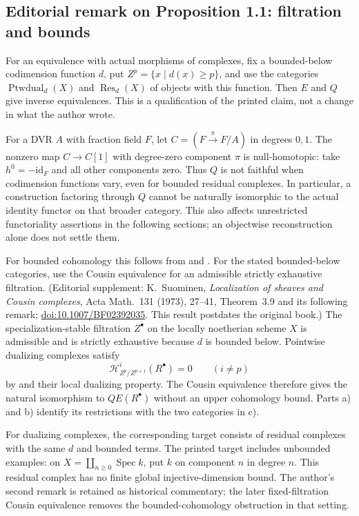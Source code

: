 \subsection*{Editorial remark on Proposition 1.1: filtration and bounds}
For an equivalence with actual morphisms of complexes, fix a bounded-below codimension function $d$, put $Z^p=\{x\mid d(x)\geq p\}$, and use the categories $\operatorname{Ptwdual}_d(X)$ and $\operatorname{Res}_d(X)$ of objects with this function. Then $E$ and $Q$ give inverse equivalences. This is a qualification of the printed claim, not a change in what the author wrote.

For a DVR $A$ with fraction field $F$, let $C=(F\xrightarrow{\pi}F/A)$ in degrees $0,1$. The nonzero map $C\to C[1]$ with degree-zero component $\pi$ is null-homotopic: take $h^0=-\mathrm{id}_F$ and all other components zero. Thus $Q$ is not faithful when codimension functions vary, even for bounded residual complexes. In particular, a construction factoring through $Q$ cannot be naturally isomorphic to the actual identity functor on that broader category. This also affects unrestricted functoriality assertions in the following sections; an objectwise reconstruction alone does not settle them.

For bounded cohomology this follows from  and . For the stated bounded-below categories, use the Cousin equivalence for an admissible strictly exhaustive filtration. (Editorial supplement: K.\ Suominen, \emph{Localization of sheaves and Cousin complexes}, Acta Math.\ 131 (1973), 27--41, Theorem~3.9 and its following remark; \href{https://doi.org/10.1007/BF02392035}{doi:10.1007/BF02392035}. This result postdates the original book.) The specialization-stable filtration $Z^\bullet$ on the locally noetherian scheme $X$ is admissible and is strictly exhaustive because $d$ is bounded below. Pointwise dualizing complexes satisfy
\[
\mathcal H^i_{Z^p/Z^{p+1}}(R^\bullet)=0\qquad(i\ne p)
\]
by  and their local dualizing property. The Cousin equivalence therefore gives the natural isomorphism to $QE(R^\bullet)$ without an upper cohomology bound. Parts a) and b) identify its restrictions with the two categories in c).

For dualizing complexes, the corresponding target consists of residual complexes with the same $d$ and bounded terms. The printed target includes unbounded examples: on $X=\coprod_{n\geq0}\operatorname{Spec}k$, put $k$ on component $n$ in degree $n$. This residual complex has no finite global injective-dimension bound. The author's second remark is retained as historical commentary; the later fixed-filtration Cousin equivalence removes the bounded-cohomology obstruction in that setting.

